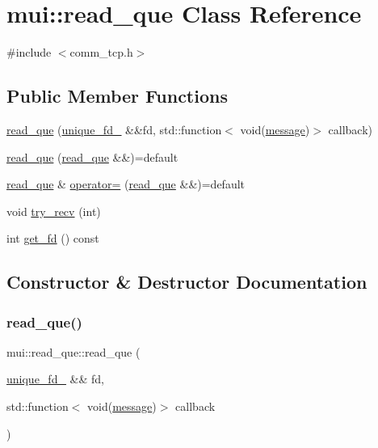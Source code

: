 \hypertarget{classmui_1_1read__que}{}\section{mui\+:\+:read\+\_\+que Class Reference}
\label{classmui_1_1read__que}


{\ttfamily \#include $<$comm\+\_\+tcp.\+h$>$}

\subsection*{Public Member Functions}
\begin{DoxyCompactItemize}
\item 
\hyperlink{classmui_1_1read__que_ab526e6fc569d4ef8dc1789b75af32991}{read\+\_\+que} (\hyperlink{classmui_1_1unique__fd__}{unique\+\_\+fd\+\_\+} \&\&fd, std\+::function$<$ void(\hyperlink{structmui_1_1message}{message})$>$ callback)
\item 
\hyperlink{classmui_1_1read__que_a7abb6753eebb99018c77b3d8575de563}{read\+\_\+que} (\hyperlink{classmui_1_1read__que}{read\+\_\+que} \&\&)=default
\item 
\hyperlink{classmui_1_1read__que}{read\+\_\+que} \& \hyperlink{classmui_1_1read__que_aeea72872bc6dcbca841543bdf4000657}{operator=} (\hyperlink{classmui_1_1read__que}{read\+\_\+que} \&\&)=default
\item 
void \hyperlink{classmui_1_1read__que_a6a444de6e353aba01530eecef26b8397}{try\+\_\+recv} (int)
\item 
int \hyperlink{classmui_1_1read__que_a6d529eb11a844c0c65764b8eeb9c801b}{get\+\_\+fd} () const
\end{DoxyCompactItemize}


\subsection{Constructor \& Destructor Documentation}
\mbox{\label{classmui_1_1read__que_ab526e6fc569d4ef8dc1789b75af32991}} 
\subsubsection{\texorpdfstring{read\+\_\+que()}{read\_que()}\hspace{0.1cm}{\footnotesize\ttfamily [1/2]}}
{\footnotesize\ttfamily mui\+::read\+\_\+que\+::read\+\_\+que (\begin{DoxyParamCaption}\item[{\hyperlink{classmui_1_1unique__fd__}{unique\+\_\+fd\+\_\+} \&\&}]{fd,  }\item[{std\+::function$<$ void(\hyperlink{structmui_1_1message}{message})$>$}]{callback }\end{DoxyParamCaption})\hspace{0.3cm}{\ttfamily [inline]}}

